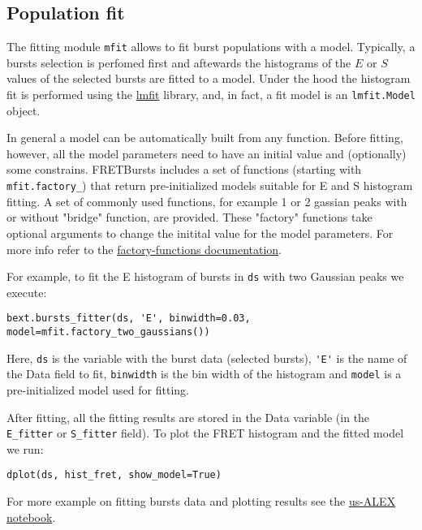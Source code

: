 
\subsection{Population fit}

The fitting module \verb|mfit| allows to fit burst populations with a model. Typically, a bursts selection is perfomed first and aftewards the histograms of the $E$ or $S$ values of the selected bursts are fitted to a model. Under the hood the histogram fit is performed using the \href{http://lmfit.github.io/lmfit-py/}{lmfit} library, and, in fact, 
a fit model is an \verb|lmfit.Model| object.

In general a model can be automatically built from any function. Before fitting, however, all the model parameters need to have an initial value and (optionally) some constrains. FRETBursts includes a set of functions (starting with \verb|mfit.factory_|) that return pre-initialized models suitable for E and S histogram fitting. A set of commonly used functions, for example 1 or 2 gassian peaks with or without "bridge" function, are provided. These "factory" functions take optional arguments to change the initital value for the model parameters. For more info refer to the
\href{http://fretbursts.readthedocs.org/en/latest/mfit.html#model-factory-functions}{factory-functions documentation}.

For example, to fit the E histogram of bursts in \verb|ds| with two Gaussian peaks we execute:

\begin{verbatim}
bext.bursts_fitter(ds, 'E', binwidth=0.03, model=mfit.factory_two_gaussians())
\end{verbatim}

Here, \verb|ds| is the variable with the burst data (selected bursts), \verb|'E'| is the name of the Data field to fit, \verb|binwidth| is the bin width of the histogram and \verb|model| is a pre-initialized model used for fitting.

After fitting, all the fitting results are stored in the Data variable (in the \verb|E_fitter| or \verb|S_fitter| field).
To plot the FRET histogram and the fitted model we run:

\begin{verbatim}
dplot(ds, hist_fret, show_model=True)
\end{verbatim}

For more example on fitting bursts data and plotting results see the \href{http://nbviewer.ipython.org/urls/raw.github.com/tritemio/FRETBursts_notebooks/master/notebooks/FRETBursts\%2520-\%2520us-ALEX\%2520smFRET\%2520burst\%2520analysis.ipynb}{us-ALEX notebook}.

